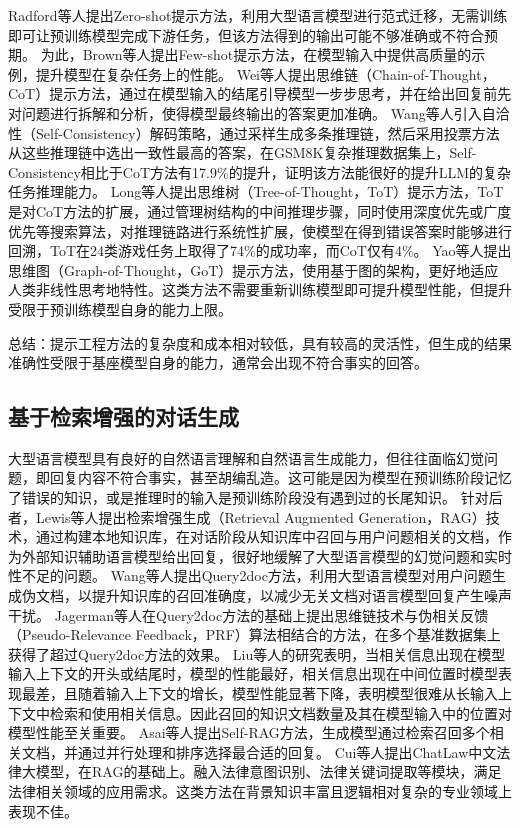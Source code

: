 Radford等人\cite{radford2019language}提出Zero-shot提示方法，利用大型语言模型进行范式迁移，无需训练即可让预训练模型完成下游任务，但该方法得到的输出可能不够准确或不符合预期。
为此，Brown等人\cite{DBLP:conf/nips/BrownMRSKDNSSAA20}提出Few-shot提示方法，在模型输入中提供高质量的示例，提升模型在复杂任务上的性能。
Wei等人\cite{DBLP:conf/nips/Wei0SBIXCLZ22}提出思维链（Chain-of-Thought，CoT）提示方法，通过在模型输入的结尾引导模型一步步思考，并在给出回复前先对问题进行拆解和分析，使得模型最终输出的答案更加准确。
Wang等人\cite{DBLP:conf/iclr/0002WSLCNCZ23}引入自洽性（Self-Consistency）解码策略，通过采样生成多条推理链，然后采用投票方法从这些推理链中选出一致性最高的答案，在GSM8K复杂推理数据集上，Self-Consistency相比于CoT方法有17.9\%的提升，证明该方法能很好的提升LLM的复杂任务推理能力。
Long等人\cite{DBLP:journals/corr/abs-2305-08291}提出思维树（Tree-of-Thought，ToT）提示方法，ToT是对CoT方法的扩展，通过管理树结构的中间推理步骤，同时使用深度优先或广度优先等搜索算法，对推理链路进行系统性扩展，使模型在得到错误答案时能够进行回溯，ToT在24类游戏任务上取得了74\%的成功率，而CoT仅有4\%。
Yao等人\cite{DBLP:journals/corr/abs-2305-16582}提出思维图（Graph-of-Thought，GoT）提示方法，使用基于图的架构，更好地适应人类非线性思考地特性。这类方法不需要重新训练模型即可提升模型性能，但提升受限于预训练模型自身的能力上限。

总结：提示工程方法的复杂度和成本相对较低，具有较高的灵活性，但生成的结果准确性受限于基座模型自身的能力，通常会出现不符合事实的回答。

\subsection{基于检索增强的对话生成}

大型语言模型具有良好的自然语言理解和自然语言生成能力，但往往面临幻觉问题，即回复内容不符合事实，甚至胡编乱造。这可能是因为模型在预训练阶段记忆了错误的知识，或是推理时的输入是预训练阶段没有遇到过的长尾知识。
针对后者，Lewis等人\cite{DBLP:conf/nips/LewisPPPKGKLYR020}提出检索增强生成（Retrieval Augmented Generation，RAG）技术，通过构建本地知识库，在对话阶段从知识库中召回与用户问题相关的文档，作为外部知识辅助语言模型给出回复，很好地缓解了大型语言模型的幻觉问题和实时性不足的问题。
Wang等人\cite{DBLP:conf/emnlp/WangYW23}提出Query2doc方法，利用大型语言模型对用户问题生成伪文档，以提升知识库的召回准确度，以减少无关文档对语言模型回复产生噪声干扰。
Jagerman等人\cite{DBLP:journals/corr/abs-2305-03653}在Query2doc方法的基础上提出思维链技术与伪相关反馈（Pseudo-Relevance Feedback，PRF）算法相结合的方法，在多个基准数据集上获得了超过Query2doc方法的效果。
Liu等人\cite{DBLP:journals/corr/abs-2307-03172}的研究表明，当相关信息出现在模型输入上下文的开头或结尾时，模型的性能最好，相关信息出现在中间位置时模型表现最差，且随着输入上下文的增长，模型性能显著下降，表明模型很难从长输入上下文中检索和使用相关信息。因此召回的知识文档数量及其在模型输入中的位置对模型性能至关重要。
Asai等人\cite{DBLP:journals/corr/abs-2310-11511}提出Self-RAG方法，生成模型通过检索召回多个相关文档，并通过并行处理和排序选择最合适的回复。
Cui等人\cite{DBLP:journals/corr/abs-2306-16092}提出ChatLaw中文法律大模型，在RAG的基础上。融入法律意图识别、法律关键词提取等模块，满足法律相关领域的应用需求。这类方法在背景知识丰富且逻辑相对复杂的专业领域上表现不佳。

